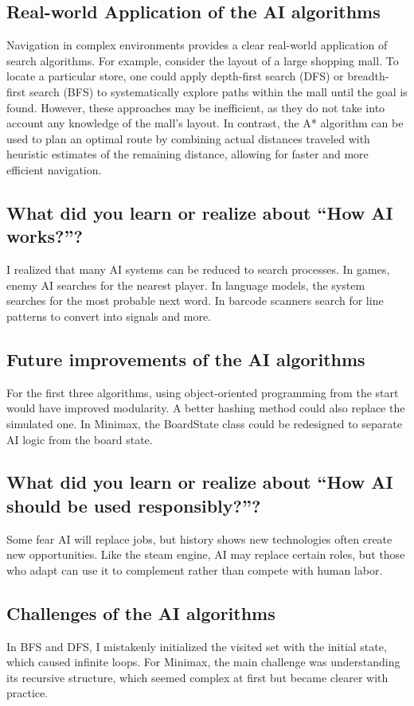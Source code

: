 \documentclass[journal]{./IEEE/IEEEtran}
\begin{document}
\subsection{Real-world Application of the AI algorithms}
Navigation in complex environments provides a clear real-world application of search algorithms. 
For example, consider the layout of a large shopping mall. To locate a particular store, one could 
apply depth-first search (DFS) or breadth-first search (BFS) to systematically explore paths within 
the mall until the goal is found. However, these approaches may be inefficient, as they do not take 
into account any knowledge of the mall’s layout. In contrast, the A* algorithm can be used to plan 
an optimal route by combining actual distances traveled with heuristic estimates of the remaining 
distance, allowing for faster and more efficient navigation.

\subsection{What did you learn or realize about “How AI works?”?}
I realized that many AI systems can be reduced to search processes. In games, enemy AI searches for 
the nearest player. In language models, the system searches for the most probable next word. In barcode scanners 
search for line patterns to convert into signals and more.  

\subsection{Future improvements of the AI algorithms}
For the first three algorithms, using object-oriented programming from the start would have improved 
modularity. A better hashing method could also replace the simulated one. In Minimax, the 
BoardState class could be redesigned to separate AI logic from the board state.  

\subsection{What did you learn or realize about “How AI should be used responsibly?”?}
Some fear AI will replace jobs, but history shows new technologies often create new opportunities. 
Like the steam engine, AI may replace certain roles, but those who adapt can use it to complement 
rather than compete with human labor.  

\subsection{Challenges of the AI algorithms}
In BFS and DFS, I mistakenly initialized the visited set with the initial state, which caused 
infinite loops. For Minimax, the main challenge was understanding its recursive structure, which 
seemed complex at first but became clearer with practice.  
\end{document}
